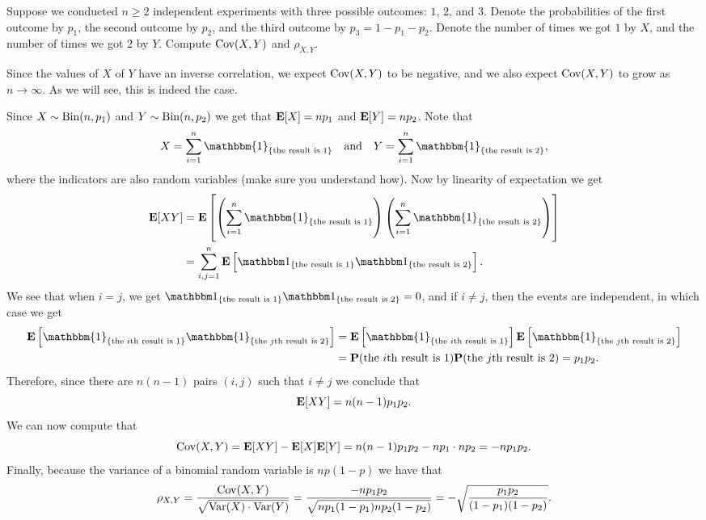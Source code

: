 \documentclass[11pt,a4paper]{article}
\begin{document}
\begin{exercise}
  \label{ex:cov}
  Suppose we conducted $n \geq 2$ independent experiments with
  three possible outcomes: $1$, $2$, and $3$.
  Denote the probabilities of the first outcome by $p_1$,
  the second outcome by $p_2$, and the third outcome
  by $p_3 = 1 - p_1 - p_2$.
  Denote the number of times we got $1$ by $X$, and the number
  of times we got $2$ by $Y$.
  Compute $\operatorname{Cov}(X,Y)$ and $\rho_{X,Y}$.
\end{exercise}
\begin{solution}
  Since the values of $X$ of $Y$ have an inverse correlation,
  we expect $\operatorname{Cov}(X,Y)$ to be negative,
  and we also expect $\operatorname{Cov}(X,Y)$ to grow as $n \to \infty$.
  As we will see, this is indeed the case.

  Since $X \sim \operatorname{Bin}(n,p_1)$ and 
  $Y \sim \operatorname{Bin}(n,p_2)$ we get that $\mathbf{E}[X] = np_1$ and $\mathbf{E}[Y] = np_2$.
  Note that
  \[
    X = \sum_{i=1}^{n} \mathbbm{1}_{\{\text{the result is $1$}\}} \tand
    Y = \sum_{i=1}^{n} \mathbbm{1}_{\{\text{the result is $2$}\}},
  \]
  where the indicators are also random variables
  (make sure you understand how).
  Now by linearity of expectation we get
  \begin{align*}
    \E[XY] &=
    \E\left[
    \left(\sum_{i=1}^{n} \mathbbm{1}_{\{\text{the result is $1$}\}}\right)
    \left(\sum_{i=1}^{n} \mathbbm{1}_{\{\text{the result is $2$}\}}\right)
    \right] \\
    &= \sum_{i,j=1}^{n} \E\left[
    \ind_{\{\text{the result is $1$}\}} \ind_{\{\text{the result is $2$}\}}
    \right].
  \end{align*}
  We see that when $i = j$,
  we get
  $\ind_{\{\text{the result is $1$}\}} \ind_{\{\text{the result is $2$}\}} = 0$, and
  if $i \neq j$, then the events are independent,
  in which case we get
  \begin{align*}
    \E\left[
    \mathbbm{1}_{\{\text{the $i$th result is $1$}\}}
    \mathbbm{1}_{\{\text{the $j$th result is $2$}\}}
    \right] &=
    \E\left[
    \mathbbm{1}_{\{\text{the $i$th result is $1$}\}}
    \right]
    \E\left[
    \mathbbm{1}_{\{\text{the $j$th result is $2$}\}}
    \right] \\
    &= 
    \Prob(\text{the $i$th result is $1$})
    \Prob(\text{the $j$th result is $2$}) = p_1p_2.
  \end{align*}
  Therefore, since there are $n(n-1)$ pairs $(i,j)$ such that
  $i \neq j$ we conclude that
  \[
    \mathbf{E}[XY] = n(n-1) p_1 p_2.
  \]
  We can now compute that
  \[
    \operatorname{Cov}(X,Y) =
    \mathbf{E}[XY] - \mathbf{E}[X] \mathbf{E}[Y] =
    n(n-1) p_1 p_2 - n p_1 \cdot n p_2 = -n p_1 p_2.
  \]
  Finally, because the variance of a binomial random variable is
  $np(1-p)$ we have that
  \[
    \rho_{X,Y} =
    \frac{\operatorname{Cov}(X,Y)}{\sqrt{\operatorname{Var}(X) \cdot \operatorname{Var}(Y)}} =
    \frac{-n p_1 p_2}{\sqrt{np_1(1-p_1)np_2(1-p_2)}} =
    - \sqrt{\frac{p_1 p_2}{(1 - p_1)(1 - p_2)}}.
  \]
\end{solution}
\end{document}
